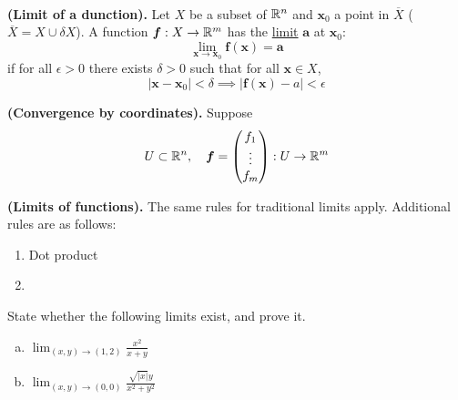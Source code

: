 \\

\begin{defn}
\textbf{(Limit of a dunction).} Let $X$ be a subset of $\mathbb{R}^n$ and $\bm{x}_0$ a point in $\overline{X}$ ($\overline{X}=X\cup \delta X$). A function $\bm{f} : X \rightarrow \mathbb{R}^m$ has the \ul{limit}
 $\bm{a}$ at $\bm{x}_0$:
\[\lim_{\bm{x}\rightarrow \bm{x}_0}\bm{f}(\bm{x}) = \bm{a}\]
if for all $\epsilon > 0$ there exists $\delta > 0$ such that for all $\bm{x}\in X$,
\[|\bm{x}-\bm{x}_0|<\delta \implies |\bm{f}(\bm{x})-a|<\epsilon\]
\end{defn}

\begin{proposition}
\textbf{(Convergence by coordinates).} Suppose
\[U\subset \mathbb{R}^n, \quad \bm{f}=\begin{pmatrix} f_1 \\ \vdots \\ f_m \end{pmatrix}: U\rightarrow \mathbb{R}^m\]
\end{proposition}

\begin{theorem}
  \textbf{(Limits of functions).} The same rules for traditional limits apply. Additional rules are as follows:
  \begin{enumerate}
    \item Dot product
    \item
  \end{enumerate}
\end{theorem}

 State whether the following limits exist, and prove it. 
\begin{enumerate}[a.]
  \item $\displaystyle \lim_{(x,y)\rightarrow (1,2)} \frac{x^2}{x+y}$
  \item $\displaystyle \lim_{(x,y)\rightarrow (0,0)} \frac{\sqrt{|x|}y}{x^2+y^2}$

\end{enumerate}
